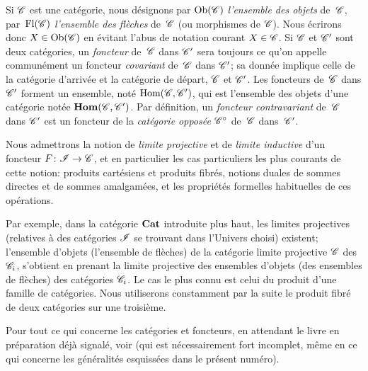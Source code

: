 Si
$\cal{C}$ est une cat\'egorie, nous d\'esignons par $\Ob(\cal{C})$
\label{indnot:fd}\emph{l'ensemble des objets} de~$\cal{C}$, par~$\Fl(\cal{C})$
\label{indnot:fe}\emph{l'ensemble des flèches} de~$\cal{C}$ (ou morphismes de
$\cal{C}$). Nous \'ecrirons donc $X\in\Ob(\cal{C})$ en \'evitant
l'abus de notation courant $X\in\cal{C}$. Si $\cal{C}$ et $\cal{C}'$
sont deux cat\'egories, un \emph{foncteur} de~$\cal{C}$ dans
$\cal{C}'$ sera toujours ce qu'on appelle commun\'ement un foncteur
\emph{covariant} de~$\cal{C}$ dans $\cal{C}'$; sa donn\'ee implique
celle de la cat\'egorie d'arriv\'ee et la cat\'egorie de
d\'epart, $\cal{C}$ et $\cal{C}'$. Les foncteurs de~$\cal{C}$ dans
$\cal{C}'$ forment un ensemble, not\'e $\Hom(\cal{C},\cal{C}')$, qui
est l'ensemble des objets d'une cat\'egorie not\'ee
$\SheafHom(\cal{C},\cal{C}')$.
\label{indnot:ff}Par d\'efinition, un \emph{foncteur contravariant} de~$\cal{C}$ dans
$\cal{C}'$ est un foncteur de la \emph{catégorie opposée}
$\cal{C}^\circ$
\label{indnot:fg}de~$\cal{C}$ dans~$\cal{C}'$.

Nous admettrons la notion de \emph{limite projective} et de
\emph{limite inductive} d'un foncteur $F\colon \cal{I}\to \cal{C}$, et
en particulier les cas particuliers les plus courants de cette notion:
produits cart\'esiens et produits fibr\'es, notions duales de
sommes directes et de sommes amalgam\'ees, et les propri\'et\'es
formelles habituelles de ces op\'erations.

Par exemple, dans la cat\'egorie $\mathbf{Cat}$ introduite plus haut, les
limites projectives (relatives \`a des cat\'egories $\cal{I}$ se
trouvant dans l'Univers choisi) existent; l'ensemble d'objets
(\resp l'ensemble de fl\`eches) de la cat\'egorie limite
projective $\cal{C}$ des $\cal{C}_i$, s'obtient en prenant la limite
projective des ensembles d'objets (\resp des ensembles de fl\`eches)
des cat\'egories $\cal{C}_i$. Le cas le plus connu est celui du
produit d'une famille de cat\'egories. Nous utiliserons constamment
par la suite le produit fibr\'e de deux cat\'egories sur une
troisi\`eme.

Pour tout ce qui concerne les cat\'egories et foncteurs, en
attendant le livre en pr\'eparation d\'ej\`a signal\'e, voir
\cite{VI.1} (qui est n\'ecessairement fort incomplet, m\^eme en ce qui
concerne les g\'en\'eralit\'es esquiss\'ees dans le
pr\'esent num\'ero).

